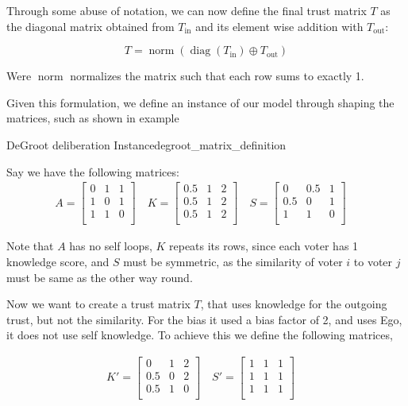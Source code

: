 Through some abuse of notation, we can now define the final trust matrix $T$ as the diagonal matrix obtained from $T_{\text{in}}$ and its element wise addition with $T_{\text{out}}$:

\begin{equation}
	T = \operatorname{norm}\left(\operatorname{diag}(T_{\text{in}}) \oplus T_{\text{out}}\right)
	\label{eq:final_trust}
\end{equation}

Were $\operatorname{norm}$ normalizes the matrix such that each row sums to exactly 1.


Given this formulation, we define an instance of our model through shaping the matrices, such as shown in example

\begin{example}{DeGroot deliberation Instance}{degroot_matrix_definition}

	Say we have the following matrices:
	\begin{align}
		A = \begin{bmatrix}
			    0 & 1 & 1 \\
			    1 & 0 & 1 \\
			    1 & 1 & 0 \\
		    \end{bmatrix} \quad
		K = \begin{bmatrix}
			    0.5 & 1 & 2 \\
			    0.5 & 1 & 2 \\
			    0.5 & 1 & 2 \\
		    \end{bmatrix}\quad
		S = \begin{bmatrix}
			    0   & 0.5 & 1 \\
			    0.5 & 0   & 1 \\
			    1   & 1   & 0 \\
		    \end{bmatrix}\quad
	\end{align}

	Note that $A$ has no self loops, $K$ repeats its rows, since each voter has 1
	knowledge score, and $S$ must be symmetric, as the similarity of voter $i$
	to voter $j$ must be same as the other way round.

	Now we want to create a trust matrix $T$, that uses knowledge for the outgoing trust, but not the similarity. For the bias it used a bias factor of 2, and uses Ego, it does not use self knowledge. To achieve this we define the following matrices,

	\begin{align}
		K' = \begin{bmatrix}
			     0   & 1 & 2 \\
			     0.5 & 0 & 2 \\
			     0.5 & 1 & 0 \\
		     \end{bmatrix}\quad
		S' = \begin{bmatrix}
			     1 & 1 & 1 \\
			     1 & 1 & 1 \\
			     1 & 1 & 1 \\
		     \end{bmatrix}\quad
	\end{align}


\end{example}
